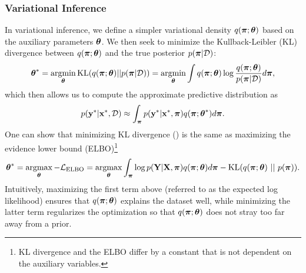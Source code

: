 \subsubsection{Variational Inference}
In variational inference, we define a simpler variational density $q(\boldsymbol{\mathbf{\pi}}; \boldsymbol{\mathbf{\theta}})$ based on the auxiliary parameters $\boldsymbol{\mathbf{\theta}}$. We then seek to minimize the Kullback-Leibler (KL) divergence \citep{kullback1951information} between $q(\boldsymbol{\mathbf{\pi}}; \boldsymbol{\mathbf{\theta}})$ and the true posterior $p(\boldsymbol{\mathbf{\pi}} | \mathcal{D})$:
\begin{equation}
\label{eq:sun_bcnn_KL}
	\boldsymbol{\mathbf{\theta}}^* = \operatorname*{argmin}_{\boldsymbol{\mathbf{\theta}}}\text{KL}(q(\boldsymbol{\mathbf{\pi}}; \boldsymbol{\mathbf{\theta}}) || p(\boldsymbol{\mathbf{\pi}} | \mathcal{D})) = \operatorname*{argmin}_{\boldsymbol{\mathbf{\theta}}} \int q(\boldsymbol{\mathbf{\pi}}; \boldsymbol{\mathbf{\theta}}) \log \frac{q(\boldsymbol{\mathbf{\pi}}; \boldsymbol{\mathbf{\theta}})}{p(\boldsymbol{\mathbf{\pi}} | \mathcal{D})} d \boldsymbol{\mathbf{\pi}},
\end{equation}
which then allows us to compute the approximate predictive distribution as
\begin{equation}
	p(\boldsymbol{\mathbf{y}}^* | \boldsymbol{\mathbf{x}}^*, \mathcal{D}) \approx \int_{\boldsymbol{\mathbf{\pi}}}  p(\boldsymbol{\mathbf{y}}^* | \boldsymbol{\mathbf{x}}^*, \boldsymbol{\mathbf{\pi}}) q(\boldsymbol{\mathbf{\pi}}; \boldsymbol{\mathbf{\theta}}^*) d\boldsymbol{\mathbf{\pi}}.
\end{equation}
One can show that minimizing KL divergence () is the same as maximizing the evidence lower bound (ELBO)\footnote{KL divergence and the ELBO differ by a constant that is not dependent on the auxiliary variables.} 
\begin{equation}
\label{eq:sun_bcnn_ELBO}
	\boldsymbol{\mathbf{\theta}}^* = \operatorname*{argmax}_{\boldsymbol{\mathbf{\theta}}} -\mathcal{L}_{\text{ELBO}} = \operatorname*{argmax}_{\boldsymbol{\mathbf{\theta}}} \int_{\boldsymbol{\mathbf{\pi}}}  \log p(\boldsymbol{\mathbf{Y}} | \boldsymbol{\mathbf{X}}, \boldsymbol{\mathbf{\pi}})  q(\boldsymbol{\mathbf{\pi}}; \boldsymbol{\mathbf{\theta}}) d\boldsymbol{\mathbf{\pi}} -  \text{KL}(q(\boldsymbol{\mathbf{\pi}}; \boldsymbol{\mathbf{\theta}}) ~ || ~ p(\boldsymbol{\mathbf{\pi}})).
\end{equation}
Intuitively, maximizing the first term above (referred to as the expected log likelihood) ensures that $q(\boldsymbol{\mathbf{\pi}}; \boldsymbol{\mathbf{\theta}})$ explains the dataset well, while minimizing the latter term regularizes the optimization so that $q(\boldsymbol{\mathbf{\pi}}; \boldsymbol{\mathbf{\theta}})$ does not stray too far away from a prior.




